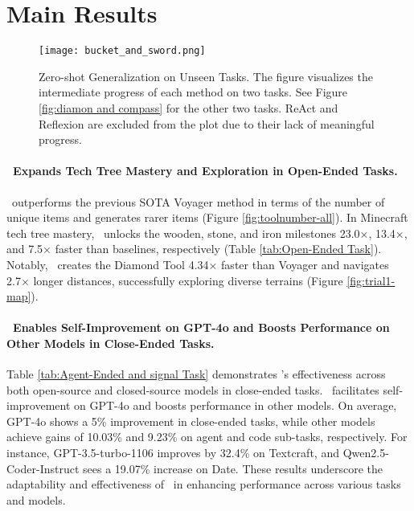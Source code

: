 \section{Main Results}
\label{sec:mainresult}


\begin{figure*}[ht]
\begin{center}
\centerline{\texttt{[image: bucket\_and\_sword.png]}}
\caption{Zero-shot Generalization on Unseen Tasks. The figure visualizes the intermediate progress of each method on two tasks. See Figure \ref{fig:diamon and compass} for the other two tasks. ReAct and Reflexion are excluded from the plot due to their lack of meaningful progress.}
\label{fig:unseen_task}
\end{center}
\vskip -0.3in
\end{figure*}

\paragraph{\ours\ Expands Tech Tree Mastery and Exploration in Open-Ended Tasks.}
\ours\ outperforms the previous SOTA Voyager method in terms of the number of unique items and generates rarer items (Figure \ref{fig:toolnumber-all}). In Minecraft tech tree mastery, \ours\ unlocks the wooden, stone, and iron milestones 23.0×, 13.4×, and 7.5× faster than baselines, respectively (Table \ref{tab:Open-Ended Task}). Notably, \ours\ creates the Diamond Tool 4.34× faster than Voyager and navigates 2.7× longer distances, successfully exploring diverse terrains (Figure \ref{fig:trial1-map}).
\paragraph{\ours\ Enables Self-Improvement on GPT-4o and Boosts Performance on Other Models in Close-Ended Tasks.}
Table \ref{tab:Agent-Ended and signal Task} demonstrates \ours’s effectiveness across both open-source and closed-source models in close-ended tasks. \ours\ facilitates self-improvement on GPT-4o and boosts performance in other models. On average, GPT-4o shows a 5\% improvement in close-ended tasks, while other models achieve gains of 10.03\% and 9.23\% on agent and code sub-tasks, respectively. For instance, GPT-3.5-turbo-1106 improves by 32.4\% on Textcraft, and Qwen2.5-Coder-Instruct sees a 19.07\% increase on Date. These results underscore the adaptability and effectiveness of \ours\ in enhancing performance across various tasks and models.
